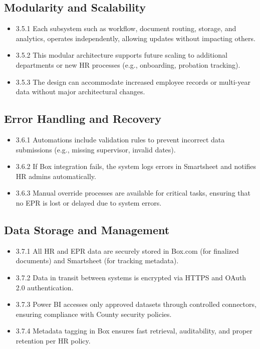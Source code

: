 \documentclass[12pt]{article}
\def\textbf#1{#1}%
\begin{document}
\subsection{Modularity and Scalability}
\begin{itemize}
  \item \textbf{3.5.1} Each subsystem such as workflow, document routing, storage, and analytics, operates independently, allowing updates without impacting others.
  \item \textbf{3.5.2} This modular architecture supports future scaling to additional departments or new HR processes (e.g., onboarding, probation tracking).
  \item \textbf{3.5.3} The design can accommodate increased employee records or multi-year data without major architectural changes.
\end{itemize}

\subsection{Error Handling and Recovery}
\begin{itemize}
  \item \textbf{3.6.1} Automations include validation rules to prevent incorrect data submissions (e.g., missing supervisor, invalid dates).
  \item \textbf{3.6.2} If Box integration fails, the system logs errors in Smartsheet and notifies HR admins automatically.
  \item \textbf{3.6.3} Manual override processes are available for critical tasks, ensuring that no EPR is lost or delayed due to system errors.
\end{itemize}

\subsection{Data Storage and Management}
\begin{itemize}
  \item \textbf{3.7.1} All HR and EPR data are securely stored in Box.com (for finalized documents) and Smartsheet (for tracking metadata).
  \item \textbf{3.7.2} Data in transit between systems is encrypted via HTTPS and OAuth 2.0 authentication.
  \item \textbf{3.7.3} Power BI accesses only approved datasets through controlled connectors, ensuring compliance with County security policies.
  \item \textbf{3.7.4} Metadata tagging in Box ensures fast retrieval, auditability, and proper retention per HR policy.
\end{itemize}
\end{document}
